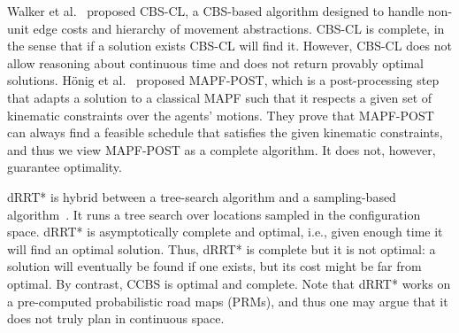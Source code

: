 \documentclass[review]{elsarticle}
\newcommand\konstantin[1]{\nb{\textbf{Konstantin:}}{red}{#1}}
\newcommand\roni[1]{\nb{\textbf{Roni:}}{green}{#1}}
\newcommand{\ccbs}{\ac{CCBS}\xspace}
\newcommand{\cbs}{\ac{CBS}\xspace}
\newcommand{\shortcite}{\cite}
\begin{document}
Walker et al.~\shortcite{walker2017using} proposed \cbs-CL, a \cbs-based algorithm designed to handle non-unit edge costs and hierarchy of movement abstractions. 
\cbs-CL is complete, in the sense that if a solution exists \cbs-CL will find it. However, \cbs-CL does not allow reasoning about continuous time and does not return provably optimal solutions. 
H{\"o}nig et al.~\shortcite{honig2016multi,honig2017summary} proposed MAPF-POST, which is a post-processing step that adapts a solution to a classical \ac{MAPF} such that it respects a given set of kinematic constraints over the agents' motions. They prove that MAPF-POST can always find a feasible schedule that satisfies the given kinematic constraints, and thus we view MAPF-POST as a complete algorithm. It does not, however, guarantee optimality. 

dRRT* is hybrid between a tree-search algorithm and a sampling-based  algorithm~\cite{shome2020drrt}. It runs a tree search over locations sampled in the configuration space. 
dRRT* is asymptotically complete and optimal, i.e., given enough time it will find an optimal solution. Thus, dRRT* is complete but it is not optimal: a solution will eventually be found if one exists, but its cost might be far from optimal. 
By contrast, \ccbs is optimal and complete. 
Note that dRRT* works on a pre-computed probabilistic road maps (PRMs), and thus one may argue that it does not truly plan in continuous space. 
\end{document}
